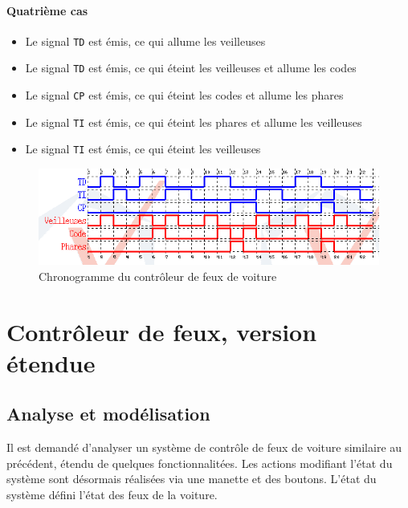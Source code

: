 \documentclass{article}
\begin{document}
      \paragraph{Quatrième cas}
        \begin{itemize}
          \item Le signal {\tt TD} est émis, ce qui allume les veilleuses
          \item Le signal {\tt TD} est émis, ce qui éteint les veilleuses et
            allume les codes
          \item Le signal {\tt CP} est émis, ce qui éteint les codes et allume
            les phares 
          \item Le signal {\tt TI} est émis, ce qui éteint les phares et allume
            les veilleuses
          \item Le signal {\tt TI} est émis, ce qui éteint les veilleuses
        \end{itemize}

      \begin{figure}
        \centering
        \includegraphics[scale=0.5]{img/chrono1_feux.png}
        \caption{Chronogramme du contrôleur de feux de voiture}
        \label{fig:chrono1_feux}
      \end{figure}

  \section{Contrôleur de feux, version étendue}
    \subsection{Analyse et modélisation}

      Il est demandé d'analyser un système de contrôle de feux de
      voiture similaire au précédent, étendu de quelques
      fonctionnalitées. Les actions modifiant l'état du système sont
      désormais réalisées via une manette et des boutons. L'état du
      système défini l'état des feux de la voiture. \medskip
\end{document}
